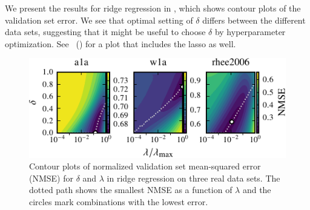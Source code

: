 We present the results for ridge regression in , which shows
contour plots of the validation set error. We see that optimal setting of \(\delta\)
differs between the different data sets, suggesting that it might be useful to choose
\(\delta\) by hyperparameter optimization. See
~() for a plot
that includes the lasso as well.


\begin{figure}[htpb]
  \centering
  \includegraphics[]{plots/hyperopt_surfaces_small.pdf}
  \caption{%
    Contour plots of normalized validation set mean-squared error (NMSE)
    for \(\delta\) and \(\lambda\) in ridge regression on
    three real data sets. The
    dotted path shows the smallest NMSE as a function of \(\lambda\) and the circles mark
    combinations with the lowest error.
  }
  \label{fig:hyperopt-contours}
\end{figure}


